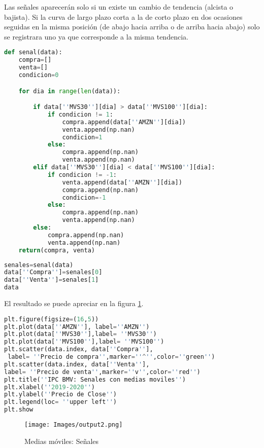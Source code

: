 \documentclass[letterpaper,12pt,oneside]{book}
\begin{document}
Las señales aparecerán solo si un existe un cambio de tendencia (alcista o bajista). Si la curva de largo plazo corta a la de corto plazo en dos ocasiones seguidas en la misma posición (de abajo hacia arriba o de arriba hacia abajo) solo se registrara uno ya que corresponde a la misma tendencia.

\begin{lstlisting}[language=Python]
def senal(data):
    compra=[]
    venta=[]
    condicion=0

    for dia in range(len(data)):

        if data[''MVS30''][dia] > data[''MVS100''][dia]:
            if condicion != 1:
                compra.append(data[''AMZN''][dia])
                venta.append(np.nan)
                condicion=1
            else:
                compra.append(np.nan)
                venta.append(np.nan)
        elif data[''MVS30''][dia] < data[''MVS100''][dia]:
            if condicion != -1:
                venta.append(data[''AMZN''][dia])
                compra.append(np.nan)
                condicion=-1
            else:
                compra.append(np.nan)
                venta.append(np.nan)
        else:
            compra.append(np.nan)
            venta.append(np.nan)
    return(compra, venta)

\end{lstlisting}




\begin{lstlisting}[language=Python]
senales=senal(data)
data[''Compra'']=senales[0]
data[''Venta'']=senales[1]
data
\end{lstlisting}

El resultado se puede apreciar en la figura \ref{fig:m3}.

\begin{lstlisting}[language=Python]
plt.figure(figsize=(16,5))
plt.plot(data[''AMZN''], label=''AMZN'')
plt.plot(data[''MVS30''],label= ''MVS30'')
plt.plot(data[''MVS100''],label= ''MVS100'')
plt.scatter(data.index, data[''Compra''],
 label= ''Precio de compra'',marker=''^'',color=''green'')
plt.scatter(data.index, data[''Venta''], 
label= ''Precio de venta'',marker=''v'',color=''red'')
plt.title(''IPC BMV: Senales con medias moviles'')
plt.xlabel(''2019-2020'')
plt.ylabel(''Precio de Close'')
plt.legend(loc= ''upper left'')
plt.show
\end{lstlisting}

\begin{figure}[ht]
	\centering
	\texttt{[image: Images/output2.png]}
	\caption{Medias móviles: Señales}
	\label{fig:m3}
\end{figure}
\end{document}

